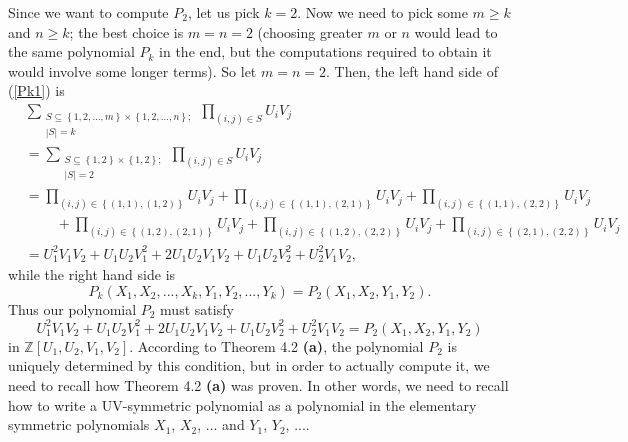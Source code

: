 \documentclass[numbers=enddot,12pt,final,onecolumn,notitlepage]{scrartcl}%
\begin{document}
Since we want to compute $P_{2}$, let us pick $k=2$. Now we need to pick some
$m\geq k$ and $n\geq k$; the best choice is $m=n=2$ (choosing greater $m$ or
$n$ would lead to the same polynomial $P_{k}$ in the end, but the computations
required to obtain it would involve some longer terms). So let $m=n=2$. Then,
the left hand side of (\ref{Pk1}) is%
\begin{align*}
&  \sum_{\substack{S\subseteq\left\{  1,2,...,m\right\}  \times\left\{
1,2,...,n\right\}  ;\\\left\vert S\right\vert =k}}\prod_{\left(  i,j\right)
\in S}U_{i}V_{j}\\
&  =\sum_{\substack{S\subseteq\left\{  1,2\right\}  \times\left\{
1,2\right\}  ;\\\left\vert S\right\vert =2}}\prod_{\left(  i,j\right)  \in
S}U_{i}V_{j}\\
&  =\prod_{\left(  i,j\right)  \in\left\{  \left(  1,1\right)  ,\left(
1,2\right)  \right\}  }U_{i}V_{j}+\prod_{\left(  i,j\right)  \in\left\{
\left(  1,1\right)  ,\left(  2,1\right)  \right\}  }U_{i}V_{j}+\prod_{\left(
i,j\right)  \in\left\{  \left(  1,1\right)  ,\left(  2,2\right)  \right\}
}U_{i}V_{j}\\
&  \ \ \ \ \ \ \ \ \ \ +\prod_{\left(  i,j\right)  \in\left\{  \left(
1,2\right)  ,\left(  2,1\right)  \right\}  }U_{i}V_{j}+\prod_{\left(
i,j\right)  \in\left\{  \left(  1,2\right)  ,\left(  2,2\right)  \right\}
}U_{i}V_{j}+\prod_{\left(  i,j\right)  \in\left\{  \left(  2,1\right)
,\left(  2,2\right)  \right\}  }U_{i}V_{j}\\
&  =U_{1}^{2}V_{1}V_{2}+U_{1}U_{2}V_{1}^{2}+2U_{1}U_{2}V_{1}V_{2}+U_{1}%
U_{2}V_{2}^{2}+U_{2}^{2}V_{1}V_{2},
\end{align*}
while the right hand side is%
\[
P_{k}\left(  X_{1},X_{2},...,X_{k},Y_{1},Y_{2},...,Y_{k}\right)  =P_{2}\left(
X_{1},X_{2},Y_{1},Y_{2}\right)  .
\]
Thus our polynomial $P_{2}$ must satisfy
\[
U_{1}^{2}V_{1}V_{2}+U_{1}U_{2}V_{1}^{2}+2U_{1}U_{2}V_{1}V_{2}+U_{1}U_{2}%
V_{2}^{2}+U_{2}^{2}V_{1}V_{2}=P_{2}\left(  X_{1},X_{2},Y_{1},Y_{2}\right)
\]
in $\mathbb{Z}\left[  U_{1},U_{2},V_{1},V_{2}\right]  $. According to Theorem
4.2 \textbf{(a)}, the polynomial $P_{2}$ is uniquely determined by this
condition, but in order to actually compute it, we need to recall how Theorem
4.2 \textbf{(a)} was proven. In other words, we need to recall how to write a
UV-symmetric polynomial as a polynomial in the elementary symmetric
polynomials $X_{1}$, $X_{2}$, $...$ and $Y_{1}$, $Y_{2}$, $...$.
\end{document}

